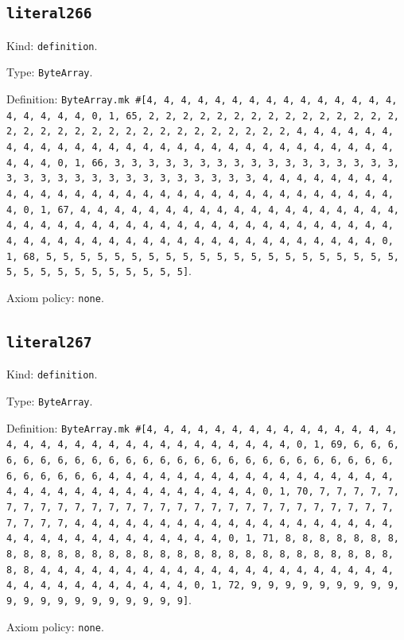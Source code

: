 \documentclass[11pt]{article}
\begin{document}
\subsection*{\texttt{literal266}}
\noindent Kind: \texttt{definition}.\par
\noindent Type: \texttt{ByteArray}.\par
\noindent Definition: \texttt{ByteArray.mk \#[4, 4, 4, 4, 4, 4, 4, 4, 4, 4, 4, 4, 4, 4, 4, 4, 4, 4, 4, 4, 0, 1, 65, 2, 2, 2, 2, 2, 2, 2, 2, 2, 2, 2, 2, 2, 2, 2, 2, 2, 2, 2, 2, 2, 2, 2, 2, 2, 2, 2, 2, 2, 2, 2, 2, 4, 4, 4, 4, 4, 4, 4, 4, 4, 4, 4, 4, 4, 4, 4, 4, 4, 4, 4, 4, 4, 4, 4, 4, 4, 4, 4, 4, 4, 4, 4, 4, 0, 1, 66, 3, 3, 3, 3, 3, 3, 3, 3, 3, 3, 3, 3, 3, 3, 3, 3, 3, 3, 3, 3, 3, 3, 3, 3, 3, 3, 3, 3, 3, 3, 3, 3, 4, 4, 4, 4, 4, 4, 4, 4, 4, 4, 4, 4, 4, 4, 4, 4, 4, 4, 4, 4, 4, 4, 4, 4, 4, 4, 4, 4, 4, 4, 4, 4, 0, 1, 67, 4, 4, 4, 4, 4, 4, 4, 4, 4, 4, 4, 4, 4, 4, 4, 4, 4, 4, 4, 4, 4, 4, 4, 4, 4, 4, 4, 4, 4, 4, 4, 4, 4, 4, 4, 4, 4, 4, 4, 4, 4, 4, 4, 4, 4, 4, 4, 4, 4, 4, 4, 4, 4, 4, 4, 4, 4, 4, 4, 4, 4, 4, 4, 4, 0, 1, 68, 5, 5, 5, 5, 5, 5, 5, 5, 5, 5, 5, 5, 5, 5, 5, 5, 5, 5, 5, 5, 5, 5, 5, 5, 5, 5, 5, 5, 5, 5, 5, 5]}.\par
\noindent Axiom policy: \texttt{none}.\par
\subsection*{\texttt{literal267}}
\noindent Kind: \texttt{definition}.\par
\noindent Type: \texttt{ByteArray}.\par
\noindent Definition: \texttt{ByteArray.mk \#[4, 4, 4, 4, 4, 4, 4, 4, 4, 4, 4, 4, 4, 4, 4, 4, 4, 4, 4, 4, 4, 4, 4, 4, 4, 4, 4, 4, 4, 4, 4, 4, 0, 1, 69, 6, 6, 6, 6, 6, 6, 6, 6, 6, 6, 6, 6, 6, 6, 6, 6, 6, 6, 6, 6, 6, 6, 6, 6, 6, 6, 6, 6, 6, 6, 6, 6, 4, 4, 4, 4, 4, 4, 4, 4, 4, 4, 4, 4, 4, 4, 4, 4, 4, 4, 4, 4, 4, 4, 4, 4, 4, 4, 4, 4, 4, 4, 4, 4, 0, 1, 70, 7, 7, 7, 7, 7, 7, 7, 7, 7, 7, 7, 7, 7, 7, 7, 7, 7, 7, 7, 7, 7, 7, 7, 7, 7, 7, 7, 7, 7, 7, 7, 7, 4, 4, 4, 4, 4, 4, 4, 4, 4, 4, 4, 4, 4, 4, 4, 4, 4, 4, 4, 4, 4, 4, 4, 4, 4, 4, 4, 4, 4, 4, 4, 4, 0, 1, 71, 8, 8, 8, 8, 8, 8, 8, 8, 8, 8, 8, 8, 8, 8, 8, 8, 8, 8, 8, 8, 8, 8, 8, 8, 8, 8, 8, 8, 8, 8, 8, 8, 4, 4, 4, 4, 4, 4, 4, 4, 4, 4, 4, 4, 4, 4, 4, 4, 4, 4, 4, 4, 4, 4, 4, 4, 4, 4, 4, 4, 4, 4, 4, 4, 0, 1, 72, 9, 9, 9, 9, 9, 9, 9, 9, 9, 9, 9, 9, 9, 9, 9, 9, 9, 9, 9, 9]}.\par
\noindent Axiom policy: \texttt{none}.\par
\end{document}
